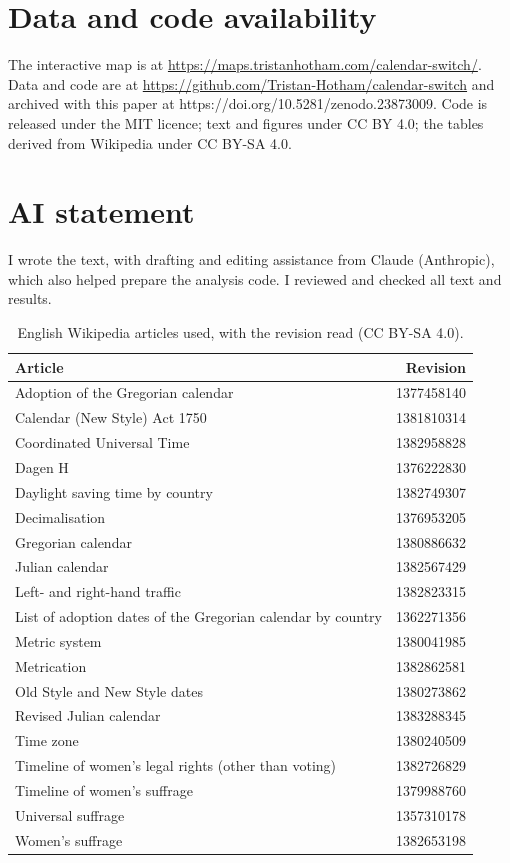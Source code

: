 \documentclass[11pt,a4paper]{article}
\begin{document}
\section*{Data and code availability}
The interactive map is at \url{https://maps.tristanhotham.com/calendar-switch/}. Data and code are at \url{https://github.com/Tristan-Hotham/calendar-switch} and archived with this paper at https://doi.org/10.5281/zenodo.23873009. Code is released under the MIT licence; text and figures under CC BY 4.0; the tables derived from Wikipedia under CC BY-SA 4.0.

\section*{AI statement}
I wrote the text, with drafting and editing assistance from Claude (Anthropic), which also helped prepare the analysis code. I reviewed and checked all text and results.

\begin{table}[tbp]\centering\small\caption{English Wikipedia articles used, with the revision read (CC BY-SA 4.0).}\label{tab:revs}\begin{tabular}{lr}\toprule Article & Revision\\\midrule
Adoption of the Gregorian calendar & 1377458140\\
Calendar (New Style) Act 1750 & 1381810314\\
Coordinated Universal Time & 1382958828\\
Dagen H & 1376222830\\
Daylight saving time by country & 1382749307\\
Decimalisation & 1376953205\\
Gregorian calendar & 1380886632\\
Julian calendar & 1382567429\\
Left- and right-hand traffic & 1382823315\\
List of adoption dates of the Gregorian calendar by country & 1362271356\\
Metric system & 1380041985\\
Metrication & 1382862581\\
Old Style and New Style dates & 1380273862\\
Revised Julian calendar & 1383288345\\
Time zone & 1380240509\\
Timeline of women's legal rights (other than voting) & 1382726829\\
Timeline of women's suffrage & 1379988760\\
Universal suffrage & 1357310178\\
Women's suffrage & 1382653198\\
\bottomrule\end{tabular}\end{table}
\end{document}

